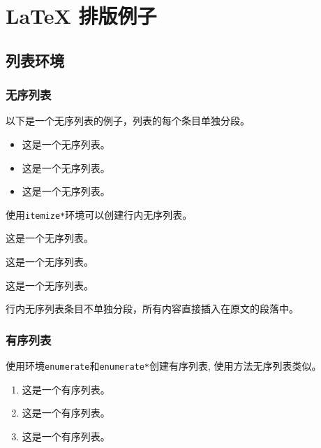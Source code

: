 
\chapter{{\LaTeX} 排版例子}
\label{chap:example}

\section{列表环境}
\label{sec:list}

\subsection{无序列表}
\label{sec:unorderlist}

以下是一个无序列表的例子，列表的每个条目单独分段。

\begin{itemize}
  \item 这是一个无序列表。
  \item 这是一个无序列表。
  \item 这是一个无序列表。
\end{itemize}

使用\verb+itemize*+环境可以创建行内无序列表。
\begin{itemize*}
  \item 这是一个无序列表。
  \item 这是一个无序列表。
  \item 这是一个无序列表。
\end{itemize*}
行内无序列表条目不单独分段，所有内容直接插入在原文的段落中。

\subsection{有序列表}
\label{sec:orderlist}

使用环境\verb+enumerate+和\verb+enumerate*+创建有序列表,
使用方法无序列表类似。

\begin{enumerate}
  \item 这是一个有序列表。
  \item 这是一个有序列表。
  \item 这是一个有序列表。
\end{enumerate}

